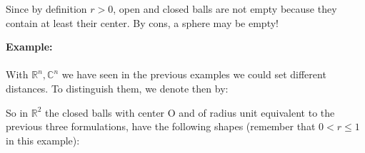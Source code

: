 	\begin{tcolorbox}[title=Remark,arc=10pt,breakable,drop lifted shadow,
  skin=enhanced,
  skin first is subskin of={enhancedfirst}{arc=10pt,no shadow},
  skin middle is subskin of={enhancedmiddle}{arc=10pt,no shadow},
  skin last is subskin of={enhancedlast}{drop lifted shadow}]
	Since by definition $r>0$, open and closed balls are not empty because they contain at least their center. By cons, a sphere may be empty!
	\end{tcolorbox}
	\begin{tcolorbox}[colframe=black,colback=white,sharp corners]
	\textbf{{\Large {}}Example:}\\\\
	With $\mathbb{R}^n,\mathbb{C}^n$ we have seen in the previous examples we could set different distances. To distinguish them, we denote then by:
	
	So in $\mathbb{R}^2$ the closed balls with center O and of radius unit equivalent to the previous three formulations, have the following shapes (remember that $0<r\leq 1$ in this example):
	\begin{figure}[H]
		\centering
		\begin{tikzpicture}[x=0.75pt,y=0.75pt,yscale=-1,xscale=1,scale=0.9]
		

\end{tikzpicture}
\end{figure}
\end{tcolorbox}
